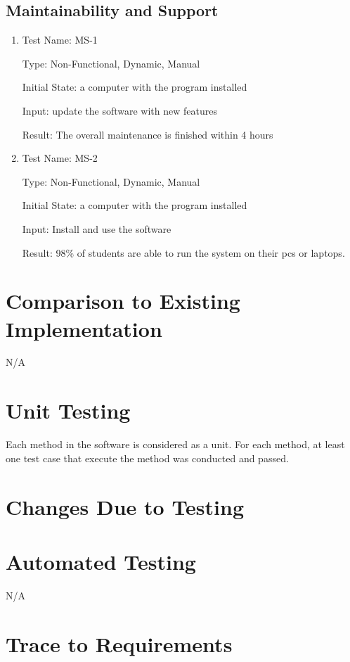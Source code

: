 \documentclass[12pt, titlepage]{article}
\begin{document}
\subsection{Maintainability and Support}
\begin{enumerate}
\item Test Name: MS-1

  Type: Non-Functional, Dynamic, Manual

  Initial State: a computer with the program installed

  Input: update the software with new features

  Result: The overall maintenance is finished within 4 hours

\item Test Name: MS-2

  Type: Non-Functional, Dynamic, Manual

  Initial State: a computer with the program installed

  Input: Install and use the software

  Result: 98\% of students are able to run the system on their pcs or laptops.
\end{enumerate}
	
\section{Comparison to Existing Implementation}	
    N/A
\section{Unit Testing}
        Each method in the software is considered as a unit. For each method, at least one test case that execute the method was conducted and passed.
        
        
\section{Changes Due to Testing}
    
\section{Automated Testing}
	N/A	
\section{Trace to Requirements}
\end{document}
